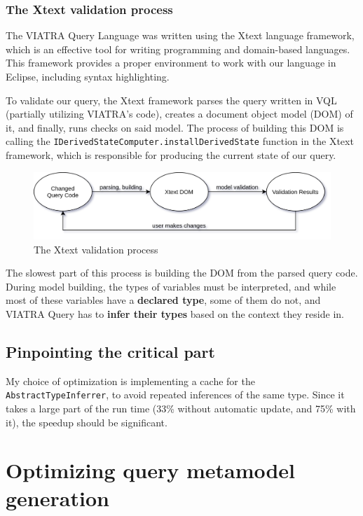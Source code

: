 \documentclass[11pt,a4paper,oneside]{report}
\begin{document}
\subsection{The Xtext validation process}
The VIATRA Query Language was written using the Xtext language framework, which
is an effective tool for writing programming and domain-based languages. This
framework provides a proper environment to work with our language in Eclipse,
including syntax highlighting.

To validate our query, the Xtext framework parses the query written in VQL
(partially utilizing VIATRA's code), creates a document object model (DOM) of
it, and finally, runs checks on said model. The process of building this DOM is
calling the \texttt{IDerivedStateComputer.installDerivedState} function in the
Xtext framework, which is responsible for producing the current state of our
query.

\begin{figure}[ht]
\centering
\includegraphics[width=150mm, keepaspectratio]{figures/xtext-validation-process.png}
\caption{The Xtext validation process}
\label{fig:xtext-validation-process}
\end{figure}

The slowest part of this process is building the DOM from the parsed query code.
During model building, the types of variables must be interpreted, and while
most of these variables have a \textbf{declared type}, some of them do not, and
VIATRA Query has to \textbf{infer their types} based on the context they reside
in.

\section{Pinpointing the critical part}

My choice of optimization is implementing a cache for the
\texttt{AbstractTypeInferrer}, to avoid repeated inferences of the same type.
Since it takes a large part of the run time (33\% without automatic update,
and 75\% with it), the speedup should be significant.

\chapter{Optimizing query metamodel generation}
\end{document}
